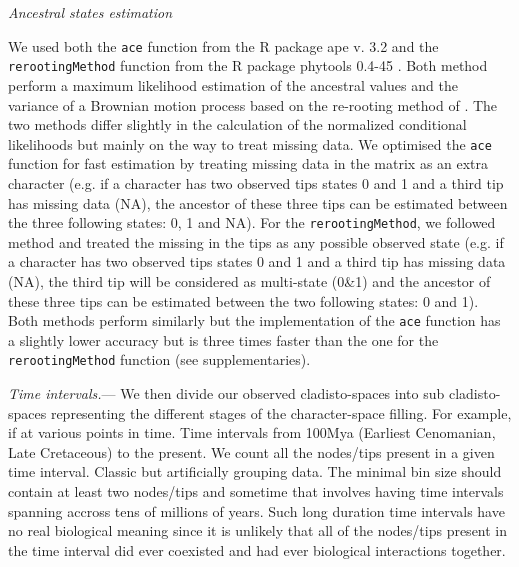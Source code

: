 \documentclass[12pt,letterpaper]{article}
\renewcommand{\subsection}[1]{%
\bigskip
\begin{center}
\begin{large}
\normalfont\itshape #1
\end{large}
\end{center}}
\renewcommand{\subsubsection}[1]{%
\vspace{2ex}
\noindent
\textit{#1.}---}
\begin{document}
\subsection{Ancestral states estimation}
We used both the \texttt{ace} function from the R package ape v. 3.2 \cite{paradisape:2004} and the 
\texttt{rerootingMethod} function from the R package phytools 0.4-45 \cite{phytools}. Both method perform a maximum likelihood estimation of the ancestral values and the variance of a Brownian motion process based on the re-rooting method of \cite{Yang01121995}. The two methods differ slightly in the calculation of the normalized conditional likelihoods but mainly on the way to treat missing data. We optimised the \texttt{ace} function for fast estimation by treating missing data in the matrix as an extra character (e.g. if a character has two observed tips states 0 and 1 and a third tip has missing data (NA), the ancestor of these three tips can be estimated between the three following states: 0, 1 and NA). For the \texttt{rerootingMethod}, we followed \cite{Claddis} method and treated the missing in the tips as any possible observed state (e.g. if a character has two observed tips states 0 and 1 and a third tip has missing data (NA), the third tip will be considered as multi-state (0\&1) and the ancestor of these three tips can be estimated between the two following states: 0 and 1). Both methods perform similarly but the implementation of the \texttt{ace} function has a slightly lower accuracy  but is three times faster than the one for the \texttt{rerootingMethod} function (see supplementaries).

\subsubsection{Time intervals}
We then divide our observed cladisto-spaces into sub cladisto-spaces representing the different stages of the character-space filling. For example, if at various points in time.
Time intervals from 100Mya (Earliest Cenomanian, Late Cretaceous) to the present.
We count all the nodes/tips present in a given time interval.
Classic but artificially grouping data. The minimal bin size should contain at least two nodes/tips and sometime that involves having time intervals spanning accross tens of millions of years. Such long duration time intervals have no real biological meaning since it is unlikely that all of the nodes/tips present in the time interval did ever coexisted and had ever biological interactions together.
\end{document}
